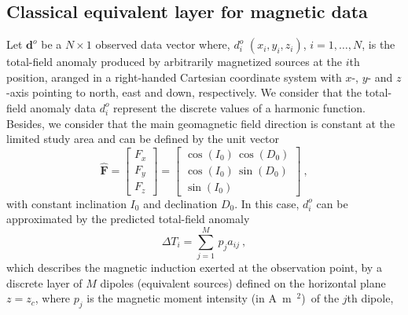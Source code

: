 \documentclass[manuscript,noblind]{geophysics}
\begin{document}
\subsection{Classical equivalent layer for magnetic data}
Let $\mathbf{d}^{o}$ be a $N \times 1$ observed data vector where, $d^{o}_{i}$ $(x_{i}, y_{i}, z_{i})$, $i =  1, \dots, N $,
is the total-field anomaly  produced by arbitrarily magnetized sources at the $i$th position,
aranged in a right-handed Cartesian coordinate system with $x$-, $y$- and $z$-axis 
pointing to north, east and down, respectively.
We consider that the total-field anomaly data $d^{o}_{i}$ represent the discrete
values of a harmonic function. Besides, we consider that the main geomagnetic field 
direction is constant at the limited study area and can be defined by the unit vector
\begin{equation}
	\hat{\mathbf{F}} = \begin{bmatrix}
		F_x \\
		F_y \\
		F_z
	\end{bmatrix} =
	\begin{bmatrix}
		\cos(I_{0}) \, \cos(D_{0}) \\
		\cos(I_{0}) \, \sin(D_{0}) \\
		\sin(I_{0})
	\end{bmatrix} \: ,
	\label{eq:unit_vector_F}
\end{equation}
with constant inclination $I_{0}$ and declination $D_{0}$.
In this case, $d^{o}_{i}$ can be approximated by the predicted total-field anomaly \citep{blakely1996}
\begin{equation}
	\Delta T_{i} = \sum_{j=1}^{M} \, p_{j} a_{ij} \: ,
	\label{eq:integral-sum_mag}
\end{equation}
which describes the magnetic induction exerted at the observation point,
by a discrete layer of $M$ dipoles (equivalent sources) defined on the horizontal plane $z = z_{c}$, 
where $p_{j}$ is the magnetic moment intensity (in A~m~$^{2}$)~of the $j$th dipole, 
\end{document}
